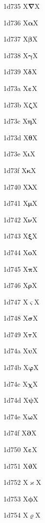 \documentclass[11pt]{article}
\begin{document}
1d735 X{\ensuremath{\boldsymbol{\nabla}}}X

1d736 X{\ensuremath{\boldsymbol{\alpha}}}X

1d737 X{\ensuremath{\boldsymbol{\beta}}}X

1d738 X{\ensuremath{\boldsymbol{\gamma}}}X

1d739 X{\ensuremath{\boldsymbol{\delta}}}X

1d73a X{\ensuremath{\boldsymbol{\varepsilon}}}X

1d73b X{\ensuremath{\boldsymbol{\zeta}}}X

1d73c X{\ensuremath{\boldsymbol{\eta}}}X

1d73d X{\ensuremath{\boldsymbol{\theta}}}X

1d73e X{\ensuremath{\boldsymbol{\iota}}}X

1d73f X{\ensuremath{\boldsymbol{\kappa}}}X

1d740 X{\ensuremath{\boldsymbol{\lambda}}}X

1d741 X{\ensuremath{\boldsymbol{\mu}}}X

1d742 X{\ensuremath{\boldsymbol{\nu}}}X

1d743 X{\ensuremath{\boldsymbol{\xi}}}X

1d744 X{\ensuremath{\boldsymbol{o}}}X

1d745 X{\ensuremath{\boldsymbol{\pi}}}X

1d746 X{\ensuremath{\boldsymbol{\rho}}}X

1d747 X{\ensuremath{\boldsymbol{\varsigma}}}X

1d748 X{\ensuremath{\boldsymbol{\sigma}}}X

1d749 X{\ensuremath{\boldsymbol{\tau}}}X

1d74a X{\ensuremath{\boldsymbol{\upsilon}}}X

1d74b X{\ensuremath{\boldsymbol{\varphi}}}X

1d74c X{\ensuremath{\boldsymbol{\chi}}}X

1d74d X{\ensuremath{\boldsymbol{\psi}}}X

1d74e X{\ensuremath{\boldsymbol{\omega}}}X

1d74f X{\ensuremath{\boldsymbol{\partial}}}X

1d750 X{\ensuremath{\boldsymbol{\varepsilon}}}X

1d751 X{\ensuremath{\boldsymbol{\vartheta}}}X

1d752 X{\ensuremath{\boldsymbol{\varkappa}}}X

1d753 X{\ensuremath{\boldsymbol{\phi}}}X

1d754 X{\ensuremath{\boldsymbol{\varrho}}}X
\end{document}
